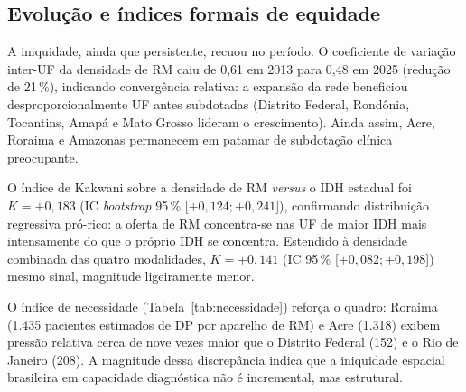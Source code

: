\documentclass[12pt,a4paper,oneside]{article}
\begin{document}
\subsection{Evolução e índices formais de equidade}

A iniquidade, ainda que persistente, recuou no período. O coeficiente
de variação inter-UF da densidade de RM caiu de 0,61 em 2013 para 0,48
em 2025 (redução de 21\,\%), indicando convergência relativa: a
expansão da rede beneficiou desproporcionalmente UF antes subdotadas
(Distrito Federal, Rondônia, Tocantins, Amapá e Mato Grosso lideram o
crescimento). Ainda assim, Acre, Roraima e Amazonas permanecem em
patamar de subdotação clínica preocupante.

O índice de Kakwani sobre a densidade de RM \textit{versus} o IDH
estadual foi $K = +0{,}183$ (IC \textit{bootstrap} 95\,\%
[$+0{,}124; +0{,}241$]), confirmando distribuição regressiva pró-rico:
a oferta de RM concentra-se nas UF de maior IDH mais intensamente do
que o próprio IDH se concentra. Estendido à densidade combinada das
quatro modalidades, $K = +0{,}141$ (IC 95\,\% [$+0{,}082; +0{,}198$])
\textemdash{} mesmo sinal, magnitude ligeiramente menor.

O índice de necessidade (Tabela~\ref{tab:necessidade}) reforça o
quadro: Roraima (1.435 pacientes estimados de DP por aparelho de RM) e
Acre (1.318) exibem pressão relativa cerca de nove vezes maior que o
Distrito Federal (152) e o Rio de Janeiro (208). A magnitude dessa
discrepância indica que a iniquidade espacial brasileira em capacidade
diagnóstica não é incremental, mas estrutural.
\end{document}
